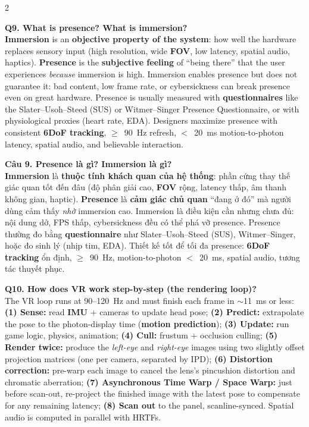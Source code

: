 \begin{paracol}{2}
\switchcolumn*

\textbf{Q9. What is presence? What is immersion?}\\
\textbf{Immersion} is an \textbf{objective property of the system}: how well the hardware replaces sensory input (high resolution, wide \textbf{FOV}, low latency, spatial audio, haptics). \textbf{Presence} is the \textbf{subjective feeling} of ``being there'' that the user experiences \textit{because} immersion is high. Immersion enables presence but does not guarantee it: bad content, low frame rate, or cybersickness can break presence even on great hardware. Presence is usually measured with \textbf{questionnaires} like the Slater--Usoh--Steed (SUS) or Witmer--Singer Presence Questionnaire, or with physiological proxies (heart rate, EDA). Designers maximize presence with consistent \textbf{6DoF tracking}, $\geq$~90~Hz refresh, $<$~20~ms motion-to-photon latency, spatial audio, and believable interaction.

\switchcolumn

\textbf{Câu 9. Presence là gì? Immersion là gì?}\\
\textbf{Immersion} là \textbf{thuộc tính khách quan của hệ thống}: phần cứng thay thế giác quan tốt đến đâu (độ phân giải cao, \textbf{FOV} rộng, latency thấp, âm thanh không gian, haptic). \textbf{Presence} là \textbf{cảm giác chủ quan} ``đang ở đó'' mà người dùng cảm thấy \textit{nhờ} immersion cao. Immersion là điều kiện cần nhưng chưa đủ: nội dung dở, FPS thấp, cybersickness đều có thể phá vỡ presence. Presence thường đo bằng \textbf{questionnaire} như Slater--Usoh--Steed (SUS), Witmer--Singer, hoặc đo sinh lý (nhịp tim, EDA). Thiết kế tốt để tối đa presence: \textbf{6DoF tracking} ổn định, $\geq$~90~Hz, motion-to-photon $<$~20~ms, spatial audio, tương tác thuyết phục.

\switchcolumn*

\textbf{Q10. How does VR work step-by-step (the rendering loop)?}\\
The VR loop runs at 90--120~Hz and must finish each frame in $\sim$11~ms or less:\\
\textbf{(1) Sense:} read \textbf{IMU} + cameras to update head pose; \textbf{(2) Predict:} extrapolate the pose to the photon-display time (\textbf{motion prediction}); \textbf{(3) Update:} run game logic, physics, animation; \textbf{(4) Cull:} frustum + occlusion culling; \textbf{(5) Render twice:} produce the \textit{left-eye} and \textit{right-eye} images using two slightly offset projection matrices (one per camera, separated by IPD); \textbf{(6) Distortion correction:} pre-warp each image to cancel the lens's pincushion distortion and chromatic aberration; \textbf{(7) Asynchronous Time Warp / Space Warp:} just before scan-out, re-project the finished image with the latest pose to compensate for any remaining latency; \textbf{(8) Scan out} to the panel, scanline-synced. Spatial audio is computed in parallel with HRTFs.


\end{paracol}
